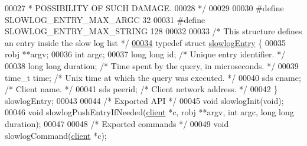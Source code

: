 \begin{DoxyCode}
00027 \textcolor{comment}{ * POSSIBILITY OF SUCH DAMAGE.}
00028 \textcolor{comment}{ */}
00029 
00030 \textcolor{preprocessor}{#}\textcolor{preprocessor}{define} \textcolor{preprocessor}{SLOWLOG\_ENTRY\_MAX\_ARGC} 32
00031 \textcolor{preprocessor}{#}\textcolor{preprocessor}{define} \textcolor{preprocessor}{SLOWLOG\_ENTRY\_MAX\_STRING} 128
00032 
00033 \textcolor{comment}{/* This structure defines an entry inside the slow log list */}
\hyperlink{structslowlogEntry}{00034} \textcolor{keyword}{typedef} \textcolor{keyword}{struct} \hyperlink{structslowlogEntry}{slowlogEntry} \{
00035     robj **argv;
00036     \textcolor{keywordtype}{int} argc;
00037     \textcolor{keywordtype}{long} \textcolor{keywordtype}{long} id;       \textcolor{comment}{/* Unique entry identifier. */}
00038     \textcolor{keywordtype}{long} \textcolor{keywordtype}{long} duration; \textcolor{comment}{/* Time spent by the query, in microseconds. */}
00039     time\_t time;        \textcolor{comment}{/* Unix time at which the query was executed. */}
00040     sds cname;          \textcolor{comment}{/* Client name. */}
00041     sds peerid;         \textcolor{comment}{/* Client network address. */}
00042 \} slowlogEntry;
00043 
00044 \textcolor{comment}{/* Exported API */}
00045 \textcolor{keywordtype}{void} slowlogInit(\textcolor{keywordtype}{void});
00046 \textcolor{keywordtype}{void} slowlogPushEntryIfNeeded(\hyperlink{structclient}{client} *c, robj **argv, \textcolor{keywordtype}{int} argc, \textcolor{keywordtype}{long} \textcolor{keywordtype}{long} duration);
00047 
00048 \textcolor{comment}{/* Exported commands */}
00049 \textcolor{keywordtype}{void} slowlogCommand(\hyperlink{structclient}{client} *c);
\end{DoxyCode}

